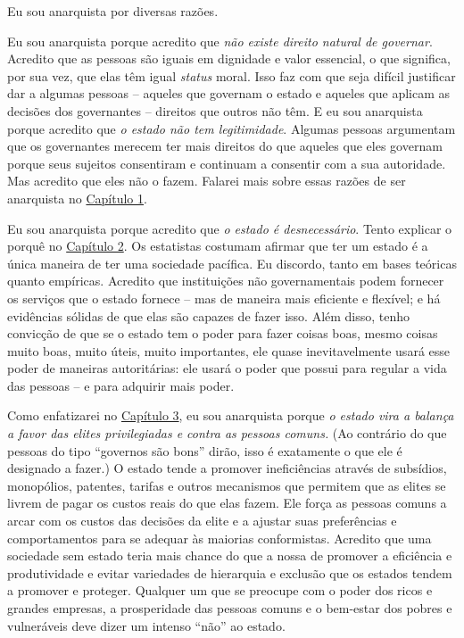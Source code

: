 Eu sou anarquista por diversas razões.

Eu sou anarquista porque acredito que \emph{não existe direito natural de governar}. Acredito que as pessoas são iguais em dignidade e valor essencial, o que significa, por sua vez, que elas têm igual \emph{status} moral. Isso faz com que seja difícil justificar dar a algumas pessoas -- aqueles que governam o estado e aqueles que aplicam as decisões dos governantes -- direitos que outros não têm. E eu sou anarquista porque acredito que \emph{o estado não tem legitimidade}. Algumas pessoas argumentam que os governantes merecem ter mais direitos do que aqueles que eles governam porque seus sujeitos consentiram e continuam a consentir com a sua autoridade. Mas acredito que eles não o fazem. Falarei mais sobre essas razões de ser anarquista no \hyperref[chap:1]{Capítulo 1}.

Eu sou anarquista porque acredito que \emph{o estado é desnecessário}. Tento explicar o porquê no \hyperref[chap:2]{Capítulo 2}. Os estatistas costumam afirmar que ter um estado é a única maneira de ter uma sociedade pacífica. Eu discordo, tanto em bases teóricas quanto empíricas. Acredito que instituições não governamentais podem fornecer os serviços que o estado fornece -- mas de maneira mais eficiente e flexível; e há evidências sólidas de que elas são capazes de fazer isso. Além disso, tenho convicção de que se o estado tem o poder para fazer coisas boas, mesmo coisas muito boas, muito úteis, muito importantes, ele quase inevitavelmente usará esse poder de maneiras autoritárias: ele usará o poder que possui para regular a vida das pessoas -- e para adquirir mais poder.

Como enfatizarei no \hyperref[chap:3]{Capítulo 3}, eu sou anarquista porque \emph{o estado vira a balança a favor das elites privilegiadas e contra as pessoas comuns.} (Ao contrário do que pessoas do tipo ``governos são bons'' dirão, isso é exatamente o que ele é designado a fazer.) O estado tende a promover ineficiências através de subsídios, monopólios, patentes, tarifas e outros mecanismos que permitem que as elites se livrem de pagar os custos reais do que elas fazem. Ele força as pessoas comuns a arcar com os custos das decisões da elite e a ajustar suas preferências e comportamentos para se adequar às maiorias conformistas. Acredito que uma sociedade sem estado teria mais chance do que a nossa de promover a eficiência e produtividade e evitar variedades de hierarquia e exclusão que os estados tendem a promover e proteger. Qualquer um que se preocupe com o poder dos ricos e grandes empresas, a prosperidade das pessoas comuns e o bem-estar dos pobres e vulneráveis deve dizer um intenso ``não'' ao estado.

